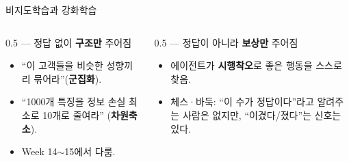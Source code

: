 \begin{frame}{비지도학습과 강화학습}
  \begin{columns}[T]
    \begin{column}{0.5\textwidth}
       --- 정답 없이 \textbf{구조만} 주어짐
      \begin{itemize}
        \item ``이 고객들을 비슷한 성향끼리 묶어라''(\textbf{군집화}).
        \item ``1000개 특징을 정보 손실 최소로 10개로 줄여라''
          (\textbf{차원축소}).
        \item Week 14$\sim$15에서 다룸.
      \end{itemize}
    \end{column}
    \begin{column}{0.5\textwidth}
       --- 정답이 아니라 \textbf{보상만} 주어짐
      \begin{itemize}
        \item 에이전트가 \textbf{시행착오}로 좋은 행동을 스스로 찾음.
        \item 체스·바둑: ``이 수가 정답이다''라고 알려주는 사람은
          없지만, ``이겼다/졌다''는 신호는 있다.
      \end{itemize}
    \end{column}
  \end{columns}
\end{frame}
